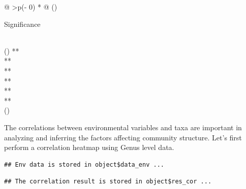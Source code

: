 \documentclass[
]{book}
\newenvironment{Shaded}{\begin{snugshade}}{\end{snugshade}}
\newcommand{\AttributeTok}[1]{\textcolor[rgb]{0.77,0.63,0.00}{#1}}
\newcommand{\CommentTok}[1]{\textcolor[rgb]{0.56,0.35,0.01}{\textit{#1}}}
\newcommand{\DecValTok}[1]{\textcolor[rgb]{0.00,0.00,0.81}{#1}}
\newcommand{\FunctionTok}[1]{\textcolor[rgb]{0.00,0.00,0.00}{#1}}
\newcommand{\NormalTok}[1]{#1}
\newcommand{\OtherTok}[1]{\textcolor[rgb]{0.56,0.35,0.01}{#1}}
\newcommand{\SpecialCharTok}[1]{\textcolor[rgb]{0.00,0.00,0.00}{#1}}
\newcommand{\StringTok}[1]{\textcolor[rgb]{0.31,0.60,0.02}{#1}}
\begin{document}
\begin{longtable}[]{@{}
  >{\centering\arraybackslash}p{(\columnwidth - 0\tabcolsep) * }@{}}
\toprule()
\begin{minipage}[b]{\linewidth}\centering
Significance
\end{minipage} \\
\midrule()
\endhead
** \\
** \\
** \\
** \\
** \\
** \\
\bottomrule()
\end{longtable}

The correlations between environmental variables and taxa are important in analyzing and inferring the factors affecting community structure.
Let's first perform a correlation heatmap using Genus level data.

\begin{Shaded}
\end{Shaded}

\begin{verbatim}
## Env data is stored in object$data_env ...
\end{verbatim}

\begin{Shaded}
\end{Shaded}

\begin{verbatim}
## The correlation result is stored in object$res_cor ...
\end{verbatim}

\begin{Shaded}
\end{Shaded}
\end{document}
